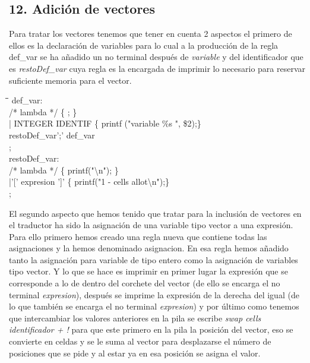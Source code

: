 \documentclass[11pt,spanish]{article}
\begin{document}
		\subsection*{12. Adición de vectores}
		\label{subsec:12}
		Para tratar los vectores tenemos que tener en cuenta 2 aspectos el primero de ellos es la declaración de variables para lo cual a la producción de la regla {\ttfamily def\_var} se ha añadido un no terminal después de \textit {variable} y del identificador que es \textit {restoDef\_var} cuya regla es la encargada de imprimir lo necesario para reservar suficiente memoria para el vector.
		\begin{tcolorbox}
		\begin{tabbing}
			\hspace*{1cm}\=\hspace*{1cm}\= \hspace*{4cm}\=\kill
			def\_var:   \\		   
				\> /* lambda */\> \>		\{ ; \}\\
				 \>| INTEGER IDENTIF\> \> \{ printf ("variable \%s ", \$2);\} \\
				 \>\>restoDef\_var';' def\_var\\
			 ;\\
			 
			restoDef\_var:\\
					\> /* lambda */ \> \>		\{ printf("\textbackslash n"); \} \\
					\>|'[' expresion ']'\> \>	\{ printf("1 - cells allot\textbackslash n");\} \\
			;
		\end{tabbing}
		\end{tcolorbox}
		El segundo aspecto que hemos tenido que tratar para la inclusión de vectores en el traductor ha sido la asignación de una variable tipo vector a una expresión. Para ello primero hemos creado una regla nueva que contiene todas las asignaciones y la hemos denominado {\ttfamily asignacion}. En esa regla hemos añadido tanto la asignación para variable de tipo entero como la asignación de variables tipo vector. Y lo que se hace es imprimir en primer lugar la expresión que se corresponde a lo de dentro del corchete del vector (de ello se encarga el no terminal \textit {expresion}), después se imprime la expresión de la derecha del igual (de lo que también se encarga el no terminal \textit {expresion}) y por último como tenemos que intercambiar los valores anteriores en la pila se escribe \textit{swap cells identificador + !} para que este primero en la pila la posición del vector, eso se convierte en celdas y se le suma al vector para desplazarse el número de posiciones que se pide y al estar ya en esa posición se asigna el valor.
\end{document}

